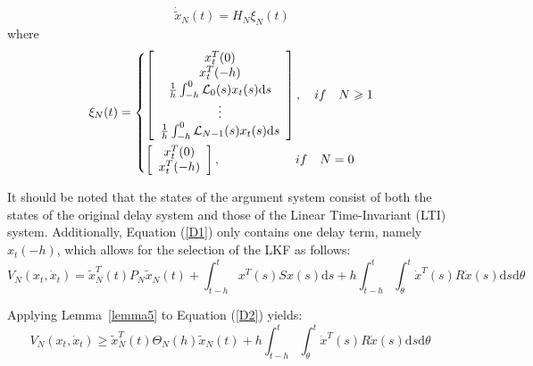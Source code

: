 \documentclass[a4paper]{cas-sc}
\begin{document}
\begin{equation}
  {\dot {\tilde x}_N}(t) = {H_N}{\xi _N}(t)
  \label{D1}
\end{equation}
where
\begin{equation}
  {\xi _N}(t) = \left\{ \begin{gathered}
    \left[ {\begin{array}{*{20}{c}}
            {x_t^T(0)}                                                          \\
            {x_t^T( - h)}                                                       \\
            {\frac{1}{h}\int_{ - h}^0 {{\mathcal{L}_0}} (s){x_t}(s){\text{d}}s} \\
            \vdots                                                              \\
            {\frac{1}{h}\int_{ - h}^0 {{\mathcal{L}_{N - 1}}} (s){x_t}(s){\text{d}}s}
          \end{array}} \right],\quad if\quad N \geqslant 1 \hfill \\
    \left[ {\begin{array}{*{20}{c}}
            {x_t^T(0)} \\
            {x_t^T( - h)}
          \end{array}} \right],\quad \quad \quad \quad \quad \quad if\quad N = 0 \hfill \\
  \end{gathered}  \right.
  \label{DX2}
\end{equation}

It should be noted that the states of the argument system consist of both the states of the original delay system and those of the Linear Time-Invariant (LTI) system. Additionally, Equation (\ref{D1}) only contains one delay term, namely ${x_t}( - h)$, which allows for the selection of the LKF as follows:
\begin{equation}
  {V_N}\left( {{x_t},{{\dot x}_t}} \right) = \tilde x_N^T(t){P_N}{\tilde x_N}(t) + \int_{t - h}^t {{x^T}(s)Sx(s){\text{d}}s}  + h\int_{t - h}^t {\int_\theta ^t {{{\dot x}^T}(s)R\dot x(s){\text{d}}s{\text{d}}\theta } }
  \label{D2}
\end{equation}

Applying Lemma~\ref{lemma5} to Equation (\ref{D2}) yields:
\begin{equation}
  {V_N}\left( {{x_t},{{\dot x}_t}} \right) \geqslant \tilde x_N^T(t){\Theta _N}(h){\tilde x_N}(t) + h\int_{t - h}^t {\int_\theta ^t {{{\dot x}^T}(s)R\dot x(s){\text{d}}s{\text{d}}\theta } } \;
  \label{D3}
\end{equation}
\end{document}
